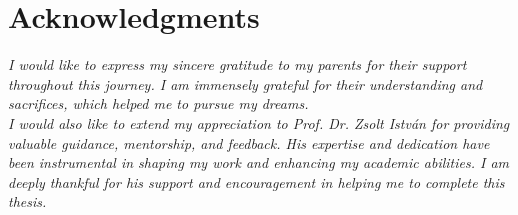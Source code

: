 




\bigskip

\begingroup
\let\clearpage\relax
\let\cleardoublepage\relax
\let\cleardoublepage\relax
\chapter*{Acknowledgments}
{\slshape 
I would like to express my sincere gratitude to my parents for their support throughout this journey. I am immensely grateful for their understanding and sacrifices, which helped me to pursue my dreams. \\

\noindent I would also like to extend my appreciation to Prof. Dr. Zsolt István for providing valuable guidance, mentorship, and feedback. His expertise and dedication have been instrumental in shaping my work and enhancing my academic abilities. I am deeply thankful for his support and encouragement in helping me to complete this thesis.
}

\endgroup
